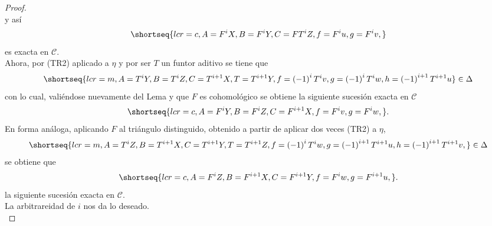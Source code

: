 \documentclass{article}
\begin{document}
\begin{enumerate}[label=\textbf{Ej \arabic*.}]
\begin{proof}
\begin{equation*}
		\end{equation*}
		y así
		\begin{equation*}
			\shortseq{lcr=c,A=F^iX,B=F^iY,C=FT^iZ,f=F^iu,g=F^iv,}
		\end{equation*}
		es exacta en $\mathscr{C}$.\\
		Ahora, por (TR2) aplicado a $\eta$ y por ser $T$ un funtor aditivo se tiene que
		\begin{equation*}
			\shortseq{lcr=m,A=T^iY,B=T^iZ,C=T^{i+1}X,T=T^{i+1}Y,f=\lrprth{-1}^iT^iv,g=\lrprth{-1}^iT^iw,h=\lrprth{-1}^{i+1}T^{i+1}u}\in\Delta
		\end{equation*}
		con lo cual, valiéndose nuevamente del Lema y que $F$ es cohomológico se obtiene la siguiente sucesión exacta en $\mathscr{C}$
		\begin{equation*}
			\shortseq{lcr=c,A=F^iY,B=F^iZ,C=F^{i+1}X,f=F^iv,g=F^{i}w,}.
		\end{equation*}
		En forma análoga, aplicando $F$ al triángulo distinguido, obtenido a partir de aplicar dos veces (TR2) a $\eta$,
		\begin{equation*}
			\shortseq{lcr=m,A=T^iZ,B=T^{i+1}X,C=T^{i+1}Y,T=T^{i+1}Z,f=\lrprth{-1}^iT^iw,g=\lrprth{-1}^{i+1}T^{i+1}u,h=\lrprth{-1}^{i+1}T^{i+1}v,}\in\Delta
		\end{equation*}
		se obtiene que
		\begin{equation*}
			\shortseq{lcr=c,A=F^iZ,B=F^{i+1}X,C=F^{i+1}Y,f=F^{i}w,g=F^{i+1}u,}.
		\end{equation*}
		la siguiente sucesión exacta en $\mathscr{C}$.\\
		La arbitrareidad de $i$ nos da lo deseado.\\
		

\end{proof}
\end{enumerate}
\end{document}
